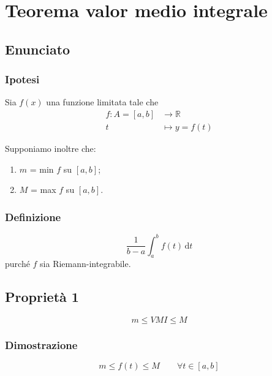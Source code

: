 \documentclass[../../dimostrazioni]{subfiles}
\begin{document}
    \chapter{Teorema valor medio integrale}
    \label{teoValorMedioIntegrale}

    \section*{Enunciato}

        \subsection*{Ipotesi}

            Sia \(f(x)\) una funzione limitata tale che
            \begin{align*}
                f : A = [a, b] &\longrightarrow \mathbb{R}\\
                t &\longmapsto y = f(t) 
            \end{align*}

            Supponiamo inoltre che:

                \begin{enumerate}
                    \indentitem \item \(m\) = min \(f\) su \([a, b]\);
                    \indentitem \item \(M\) = max \(f\) su \([a, b]\).
                \end{enumerate}  

        \subsection*{Definizione}

            \[ \frac{1}{b-a} \int_{a}^{b} \! f(t) \, \mathrm{d} t \]
            purché \(f\) sia Riemann-integrabile.

    \section*{Proprietà 1}

        \[ m \leqslant VMI \leqslant M \]

        \subsection*{Dimostrazione}
    
            \[m \leqslant f(t) \leqslant M  \qquad \forall t \in [a, b] \]
\end{document}
